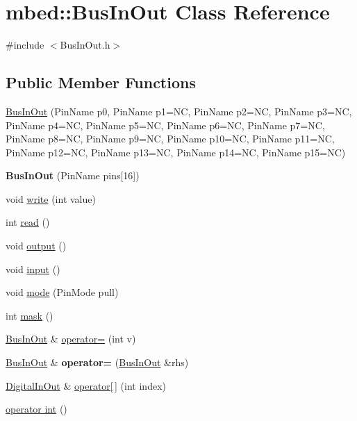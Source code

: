 \hypertarget{classmbed_1_1_bus_in_out}{}\section{mbed\+:\+:Bus\+In\+Out Class Reference}
\label{classmbed_1_1_bus_in_out}


{\ttfamily \#include $<$Bus\+In\+Out.\+h$>$}

\subsection*{Public Member Functions}
\begin{DoxyCompactItemize}
\item 
\hyperlink{classmbed_1_1_bus_in_out_aeb307d492d797e5a10919a92f1da5e31}{Bus\+In\+Out} (Pin\+Name p0, Pin\+Name p1=NC, Pin\+Name p2=NC, Pin\+Name p3=NC, Pin\+Name p4=NC, Pin\+Name p5=NC, Pin\+Name p6=NC, Pin\+Name p7=NC, Pin\+Name p8=NC, Pin\+Name p9=NC, Pin\+Name p10=NC, Pin\+Name p11=NC, Pin\+Name p12=NC, Pin\+Name p13=NC, Pin\+Name p14=NC, Pin\+Name p15=NC)
\item 
{\bfseries Bus\+In\+Out} (Pin\+Name pins\mbox{[}16\mbox{]})\hypertarget{classmbed_1_1_bus_in_out_ad8e4b46a0066126a575c054e22aa4b42}{}\label{classmbed_1_1_bus_in_out_ad8e4b46a0066126a575c054e22aa4b42}

\item 
void \hyperlink{classmbed_1_1_bus_in_out_a36473cded1109d3960d51c6f8e1ee123}{write} (int value)
\item 
int \hyperlink{classmbed_1_1_bus_in_out_a98154c0add9d2e8bec0e27ca42249b31}{read} ()
\item 
void \hyperlink{classmbed_1_1_bus_in_out_aea68cf05f895ef5d7a6c4a963fe695d4}{output} ()
\item 
void \hyperlink{classmbed_1_1_bus_in_out_a2f5cdeb39d9f1b2e71281f48ead9090f}{input} ()
\item 
void \hyperlink{classmbed_1_1_bus_in_out_ae16e26bbb20523c2ae428db3fca5bb15}{mode} (Pin\+Mode pull)
\item 
int \hyperlink{classmbed_1_1_bus_in_out_a45354e1e41ecf96b5fb5377ea4fcad72}{mask} ()
\item 
\hyperlink{classmbed_1_1_bus_in_out}{Bus\+In\+Out} \& \hyperlink{classmbed_1_1_bus_in_out_a06873b99a95de7450adf676539bf3f54}{operator=} (int v)
\item 
\hyperlink{classmbed_1_1_bus_in_out}{Bus\+In\+Out} \& {\bfseries operator=} (\hyperlink{classmbed_1_1_bus_in_out}{Bus\+In\+Out} \&rhs)\hypertarget{classmbed_1_1_bus_in_out_adc7c23db4da5248ec4276deea09f05a2}{}\label{classmbed_1_1_bus_in_out_adc7c23db4da5248ec4276deea09f05a2}

\item 
\hyperlink{classmbed_1_1_digital_in_out}{Digital\+In\+Out} \& \hyperlink{classmbed_1_1_bus_in_out_aa0dd624a54ddbf5155537b73cc9bc962}{operator\mbox{[}$\,$\mbox{]}} (int index)
\item 
\hyperlink{classmbed_1_1_bus_in_out_a63844c4d74e7de4818fa07447c2ba7c2}{operator int} ()
\end{DoxyCompactItemize}
